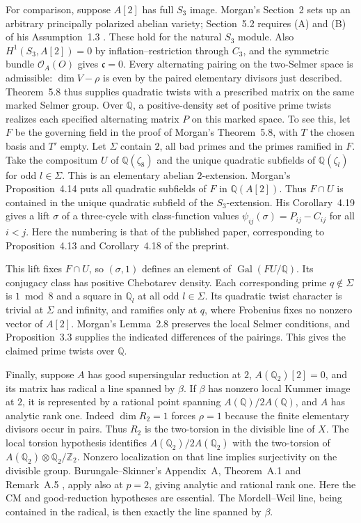 \documentclass[11pt]{article}
\newcommand{\Q}{\mathbb Q}\newcommand{\Z}{\mathbb Z}\newcommand{\F}{\mathbb F}
\begin{document}
For comparison, suppose $A[2]$ has full $S_3$ image. Morgan's
Section~2 sets up an arbitrary principally polarized abelian variety;
Section~5.2 requires (A) and (B) of his Assumption~1.3
\cite{pfMorgan}. These hold for the natural $S_3$ module. Also
$H^1(S_3,A[2])=0$ by inflation--restriction through $C_3$,
and the symmetric bundle $\mathcal O_A(O)$ gives $\mathfrak c=0$.
Every alternating pairing on the two-Selmer space is admissible:
$\dim V-\rho$ is even by the paired elementary divisors just described.
Theorem~5.8 thus supplies quadratic twists with a prescribed matrix on
the same marked Selmer group. Over $\Q$, a positive-density set of positive prime twists realizes each specified alternating matrix $P$ on this marked space. To see this, let $F$ be the governing field in the proof of Morgan's Theorem~5.8, with $T$ the chosen basis and $T'$ empty. Let $\Sigma$ contain $2$, all bad primes and the primes ramified in $F$. Take the compositum $U$ of $\Q(\zeta_8)$ and the unique quadratic subfields of $\Q(\zeta_l)$ for odd $l\in\Sigma$. This is an elementary abelian $2$-extension. Morgan's Proposition~4.14 puts all quadratic subfields of $F$ in $\Q(A[2])$. Thus $F\cap U$ is contained in the unique quadratic subfield of the $S_3$-extension. His Corollary~4.19 gives a lift $\sigma$ of a three-cycle with class-function values $\psi_{ij}(\sigma)=P_{ij}-C_{ij}$ for all $i<j$. Here the numbering is that of the published paper, corresponding to Proposition~4.13 and Corollary~4.18 of the preprint.

This lift fixes $F\cap U$, so $(\sigma,1)$ defines an element of $\operatorname{Gal}(FU/\Q)$. Its conjugacy class has positive Chebotarev density. Each corresponding prime $q\notin\Sigma$ is $1\bmod 8$ and a square in $\Q_l$ at all odd $l\in\Sigma$. Its quadratic twist character is trivial at $\Sigma$ and infinity, and ramifies only at $q$, where Frobenius fixes no nonzero vector of $A[2]$. Morgan's Lemma~2.8 preserves the local Selmer conditions, and Proposition~3.3 supplies the indicated differences of the pairings. This gives the claimed prime twists over $\Q$.

Finally, suppose $A$ has good supersingular reduction at $2$,
$A(\Q_2)[2]=0$, and its matrix has radical a line spanned by $\beta$.
If $\beta$ has nonzero local Kummer image at $2$, it is represented by
a rational point spanning $A(\Q)/2A(\Q)$, and $A$ has analytic rank
one. Indeed $\dim R_2=1$ forces $\rho=1$ because the finite elementary
divisors occur in pairs. Thus $R_2$ is the two-torsion in the divisible
line of $X$. The local torsion hypothesis identifies
$A(\Q_2)/2A(\Q_2)$ with the two-torsion of
$A(\Q_2)\otimes\Q_2/\Z_2$. Nonzero localization on that line implies
surjectivity on the divisible group. Burungale--Skinner's Appendix~A,
Theorem~A.1 and Remark~A.5 \cite{pfBS}, apply also at $p=2$, giving
analytic and rational rank one. Here the CM and good-reduction hypotheses are essential. The Mordell--Weil line, being contained
in the radical, is then exactly the line spanned by $\beta$.
\end{document}

